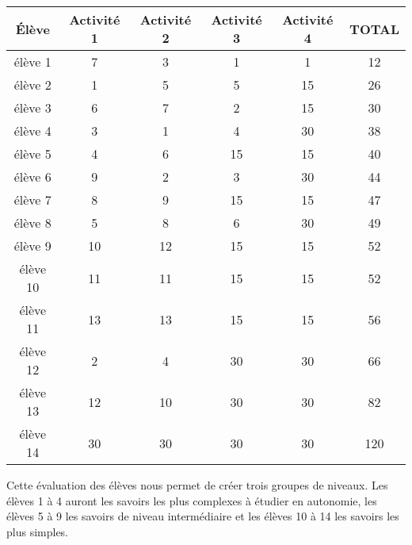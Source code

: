 \begin{center}
    \begin{tabular}{|c|c|c|c|c|c|}\hline
    \bfseries Élève & \bfseries Activité 1
    & \bfseries Activité 2 & \bfseries Activité 3
    & \bfseries  Activité 4 & \bfseries  TOTAL \\ \hline
    \rowcolor{yellow!30} élève 1 & 7 & 3 & 1 & 1 & 12 \\ \hline
    \rowcolor{yellow!30} élève 2 & 1 & 5 & 5 & 15 & 26 \\ \hline
    \rowcolor{yellow!30} élève 3 & 6 & 7 & 2 & 15 & 30 \\ \hline
    \rowcolor{yellow!30} élève 4 & 3 & 1 & 4 & 30 & 38 \\ \hline
    \rowcolor{orange!30} élève 5 & 4 & 6 & 15 & 15 & 40 \\ \hline
    \rowcolor{orange!30} élève 6 & 9 & 2 & 3 & 30 & 44 \\ \hline
    \rowcolor{orange!30} élève 7 & 8 & 9 & 15 & 15 & 47 \\ \hline
    \rowcolor{orange!30} élève 8 & 5 & 8 & 6 & 30 & 49 \\ \hline
    \rowcolor{orange!30} élève 9 & 10 & 12 & 15 & 15 & 52 \\ \hline
    \rowcolor{orange!60} élève 10 & 11 & 11 & 15 & 15 & 52 \\ \hline
    \rowcolor{orange!60} élève 11 & 13 & 13 & 15 & 15 & 56 \\ \hline
    \rowcolor{orange!60} élève 12 & 2 & 4 & 30 & 30 & 66 \\ \hline
    \rowcolor{orange!60} élève 13 & 12 & 10 & 30 & 30 & 82 \\ \hline
    \rowcolor{red!60} élève 14 & 30 & 30 & 30 & 30 & 120 \\ \hline
    \end{tabular}    
\end{center}

Cette évaluation des élèves nous permet de créer trois groupes de niveaux. Les élèves 1 à 4 auront les savoirs les plus complexes à étudier en autonomie, les élèves 5 à 9 les savoirs de niveau intermédiaire et les élèves 10 à 14 les savoirs les plus simples.




